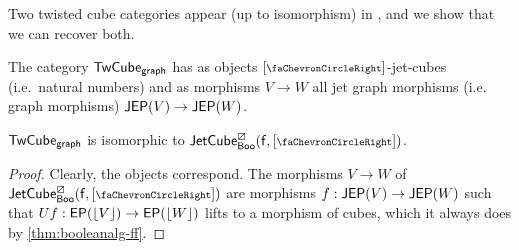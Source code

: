 \documentclass[a4paper]{memoir}
\begin{document}
Two twisted cube categories appear (up to isomorphism) in \cite{pinyo-twisted}, and we show that we can recover both.

\begin{definition} \cite[def.\ 25]{pinyo-twisted}
	The category ${\mathsf{TwCube}}_{\mathsf{graph}}$ has as objects $[\ypolar]$-jet-cubes (i.e.\ natural numbers) and as morphisms $V \to W$ all jet graph morphisms (i.e. graph morphisms) $\mathsf{JEP}(V) \to \mathsf{JEP}(W)$.
\end{definition}
\begin{proposition}
	 ${\mathsf{TwCube}}_{\mathsf{graph}}$ is isomorphic to $\jetcubefwd \cartes \booleanalg {[\ypolar]}$.
\end{proposition}
\begin{proof}
	Clearly, the objects correspond.
	The morphisms $V \to W$ of $\jetcubefwd \cartes \booleanalg {[\ypolar]}$ are morphisms $f : \mathsf{JEP}(V) \to \mathsf{JEP}(W)$ such that $Uf : \mathsf{EP}(\mathopen{}\left\lfloor V \right\rfloor\mathclose{}) \to \mathsf{EP}(\mathopen{}\left\lfloor W \right\rfloor\mathclose{})$ lifts to a morphism of cubes, which it always does by \cref{thm:booleanalg-ff}.
\end{proof}
\end{document}
